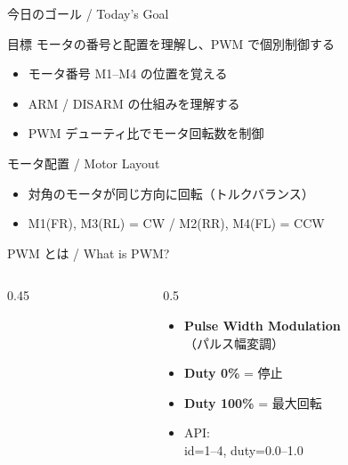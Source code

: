 \documentclass[aspectratio=169, 14pt]{beamer}
\begin{document}

\begin{frame}{今日のゴール / Today's Goal}
  \begin{block}{目標}
    モータの番号と配置を理解し、PWM で個別制御する
  \end{block}

  \vspace{1em}

  \begin{itemize}
    \item モータ番号 M1--M4 の位置を覚える
    \item ARM / DISARM の仕組みを理解する
    \item PWM デューティ比でモータ回転数を制御
  \end{itemize}
\end{frame}

\begin{frame}{モータ配置 / Motor Layout}
  \begin{center}
    \resizebox{0.38\textwidth}{!}{}
  \end{center}
  \begin{itemize}
    \item 対角のモータが同じ方向に回転（トルクバランス）
    \item M1(FR), M3(RL) = CW / M2(RR), M4(FL) = CCW
  \end{itemize}
\end{frame}

\begin{frame}{PWM とは / What is PWM?}
  \begin{columns}[T]
    \begin{column}{0.45\textwidth}
      \begin{center}
        \resizebox{!}{0.72\textheight}{}
      \end{center}
    \end{column}
    \begin{column}{0.5\textwidth}
      \vspace{1em}
      \begin{itemize}
        \item \textbf{Pulse Width Modulation}\\（パルス幅変調）
        \item \textbf{Duty 0\%} = 停止
        \item \textbf{Duty 100\%} = 最大回転
        \item API: \\
              \small id=1--4, duty=0.0--1.0
      \end{itemize}
    \end{column}
  \end{columns}
\end{frame}
\end{document}
